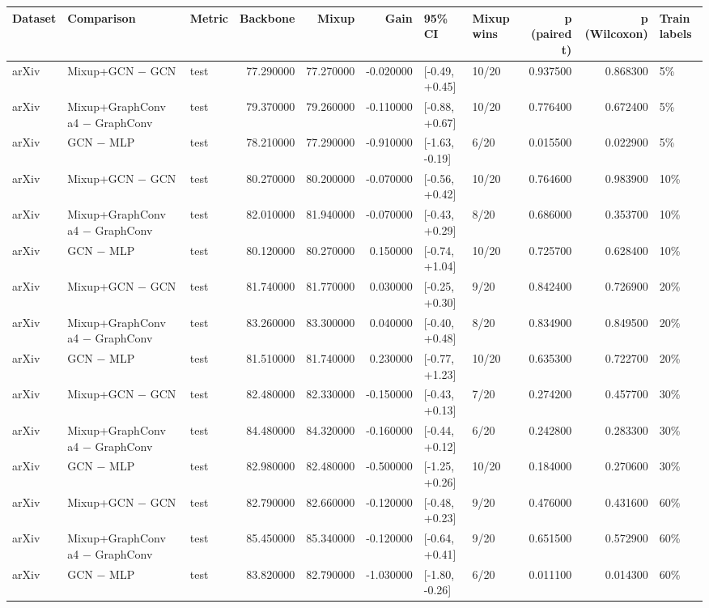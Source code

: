 \begin{tabular}{lllrrrllrrl}
\toprule
Dataset & Comparison & Metric & Backbone & Mixup & Gain & 95\% CI & Mixup wins & p (paired t) & p (Wilcoxon) & Train labels \\
\midrule
arXiv & Mixup+GCN − GCN & test & 77.290000 & 77.270000 & -0.020000 & [-0.49, +0.45] & 10/20 & 0.937500 & 0.868300 & 5\% \\
arXiv & Mixup+GraphConv a4 − GraphConv & test & 79.370000 & 79.260000 & -0.110000 & [-0.88, +0.67] & 10/20 & 0.776400 & 0.672400 & 5\% \\
arXiv & GCN − MLP & test & 78.210000 & 77.290000 & -0.910000 & [-1.63, -0.19] & 6/20 & 0.015500 & 0.022900 & 5\% \\
arXiv & Mixup+GCN − GCN & test & 80.270000 & 80.200000 & -0.070000 & [-0.56, +0.42] & 10/20 & 0.764600 & 0.983900 & 10\% \\
arXiv & Mixup+GraphConv a4 − GraphConv & test & 82.010000 & 81.940000 & -0.070000 & [-0.43, +0.29] & 8/20 & 0.686000 & 0.353700 & 10\% \\
arXiv & GCN − MLP & test & 80.120000 & 80.270000 & 0.150000 & [-0.74, +1.04] & 10/20 & 0.725700 & 0.628400 & 10\% \\
arXiv & Mixup+GCN − GCN & test & 81.740000 & 81.770000 & 0.030000 & [-0.25, +0.30] & 9/20 & 0.842400 & 0.726900 & 20\% \\
arXiv & Mixup+GraphConv a4 − GraphConv & test & 83.260000 & 83.300000 & 0.040000 & [-0.40, +0.48] & 8/20 & 0.834900 & 0.849500 & 20\% \\
arXiv & GCN − MLP & test & 81.510000 & 81.740000 & 0.230000 & [-0.77, +1.23] & 10/20 & 0.635300 & 0.722700 & 20\% \\
arXiv & Mixup+GCN − GCN & test & 82.480000 & 82.330000 & -0.150000 & [-0.43, +0.13] & 7/20 & 0.274200 & 0.457700 & 30\% \\
arXiv & Mixup+GraphConv a4 − GraphConv & test & 84.480000 & 84.320000 & -0.160000 & [-0.44, +0.12] & 6/20 & 0.242800 & 0.283300 & 30\% \\
arXiv & GCN − MLP & test & 82.980000 & 82.480000 & -0.500000 & [-1.25, +0.26] & 10/20 & 0.184000 & 0.270600 & 30\% \\
arXiv & Mixup+GCN − GCN & test & 82.790000 & 82.660000 & -0.120000 & [-0.48, +0.23] & 9/20 & 0.476000 & 0.431600 & 60\% \\
arXiv & Mixup+GraphConv a4 − GraphConv & test & 85.450000 & 85.340000 & -0.120000 & [-0.64, +0.41] & 9/20 & 0.651500 & 0.572900 & 60\% \\
arXiv & GCN − MLP & test & 83.820000 & 82.790000 & -1.030000 & [-1.80, -0.26] & 6/20 & 0.011100 & 0.014300 & 60\% \\
\bottomrule
\end{tabular}
